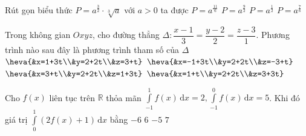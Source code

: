 \begin{ex}%
Rút gọn biểu thức $P=a^\frac{3}{2}\cdot\sqrt[3]{a}$ với $a>0$ ta được
\choice
{\True $P=a^{\frac{11}{6}}$}
{$P=a^{\frac{9}{2}}$}
{$P=a^{\frac{1}{2}}$}
{$P=a^{\frac{7}{6}}$}
\end{ex}

\begin{ex}%
Trong không gian $Oxyz$, cho đường thẳng $\Delta\colon \dfrac{x-1}{3}=\dfrac{y-2}{2}=\dfrac{z-3}{1}$. Phương trình nào sau đây là phương trình tham số của $\Delta$
\choice
{\True $\heva{&x=1+3t\\&y=2+2t\\&z=3+t}$}
{$\heva{&x=-1+3t\\&y=2+2t\\&z=-3+t}$}
{$\heva{&x=3+t\\&y=2+2t\\&z=1+3t}$}
{$\heva{&x=1+t\\&y=2+2t\\&z=3+3t}$}
\end{ex}

\begin{ex}%
Cho $f(x)$ liên tục trên $\mathbb{R}$ thỏa mãn $\displaystyle\int\limits_{-1}^1f(x) \mathrm{\,d}x=2, \displaystyle\int\limits_{-1}^0f(x) \mathrm{\,d}x=5$. Khi đó giá trị $\displaystyle\int\limits_0^1(2 f(x)+1) \mathrm{\,d}x$ bằng
\choice
{$-6$}
{$6$}
{\True $-5$}
{$7$}
\end{ex}

